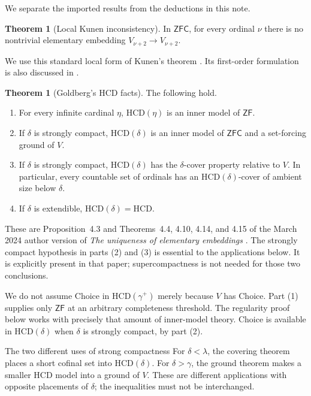 \documentclass[11pt,letterpaper]{article}
\theoremstyle{definition}
\newtheorem{theorem}[definition]{Theorem}
\newcommand{\ZFC}{\mathsf{ZFC}}
\newcommand{\ZF}{\mathsf{ZF}}
\newcommand{\HCD}{\mathrm{HCD}}
\begin{document}
We separate the imported results from the deductions in this note.

\begin{theorem}[Local Kunen inconsistency]\label{thm:kunen}
In $\ZFC$, for every ordinal $\nu$ there is no nontrivial elementary embedding $V_{\nu+2}\to V_{\nu+2}$.
\end{theorem}

We use this standard local form of Kunen's theorem \cite{kunen}. Its first-order formulation is also discussed in \cite[Section 1]{hkp}.

\begin{theorem}[Goldberg's HCD facts]\label{thm:hcd-background}
The following hold.
\begin{enumerate}
\item For every infinite cardinal $\eta$, $\HCD(\eta)$ is an inner model of $\ZF$.
\item If $\delta$ is strongly compact, $\HCD(\delta)$ is an inner model of $\ZFC$ and a set-forcing ground of $V$.
\item If $\delta$ is strongly compact, $\HCD(\delta)$ has the $\delta$-cover property relative to $V$. In particular, every countable set of ordinals has an $\HCD(\delta)$-cover of ambient size below $\delta$.
\item If $\delta$ is extendible, $\HCD(\delta)=\HCD$.
\end{enumerate}
\end{theorem}

These are Proposition~4.3 and Theorems~4.4, 4.10, 4.14, and 4.15 of the March 2024 author version of \emph{The uniqueness of elementary embeddings} \cite{uniqueness}. The strongly compact hypothesis in parts (2) and (3) is essential to the applications below. It is explicitly present in that paper; supercompactness is not needed for those two conclusions.

We do not assume Choice in $\HCD(\gamma^+)$ merely because $V$ has Choice. Part (1) supplies only $\ZF$ at an arbitrary completeness threshold. The regularity proof below works with precisely that amount of inner-model theory. Choice is available in $\HCD(\delta)$ when $\delta$ is strongly compact, by part (2).

\begin{assessment}{The two different uses of strong compactness}
For $\delta<\lambda$, the covering theorem places a short cofinal set into $\HCD(\delta)$. For $\delta>\gamma$, the ground theorem makes a smaller HCD model into a ground of $V$. These are different applications with opposite placements of $\delta$; the inequalities must not be interchanged.
\end{assessment}
\end{document}
